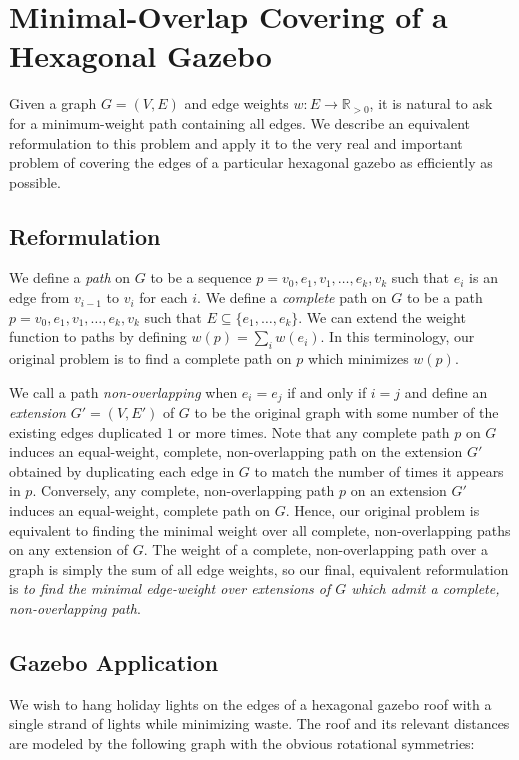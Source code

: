 \documentclass[11pt]{article}
\begin{document}
\section*{Minimal-Overlap Covering of a Hexagonal Gazebo}

Given a graph $G = (V, E)$ and edge weights $w: E \to \mathbb{R}_{> 0}$,
it is natural to ask for a minimum-weight path containing all edges.
We describe an equivalent reformulation to this problem
and apply it to the very real and important problem of covering the edges of a particular hexagonal gazebo as efficiently as possible.

\subsection*{Reformulation}

We define a \emph{path} on $G$ to be a sequence $p = v_0, e_1, v_1, \ldots, e_k, v_k$ such that
$e_i$ is an edge from $v_{i-1}$ to $v_{i}$ for each $i$.
We define a \emph{complete} path on $G$ to be a path $p = v_0, e_1, v_1, \ldots, e_k, v_k$ such that
$E \subseteq \{e_1, \ldots, e_k\}$.
We can extend the weight function to paths by defining $w(p) = \sum_{i} w(e_i)$.
In this terminology, our original problem is to find a complete path on $p$ which minimizes $w(p)$.

We call a path \emph{non-overlapping} when $e_i = e_j$ if and only if $i = j$
and define an \emph{extension} $G' = (V, E')$ of $G$ to be the original graph with some number of the existing edges duplicated $1$ or more times.
Note that any complete path $p$ on $G$
induces an equal-weight, complete, non-overlapping path on the extension $G'$
obtained by duplicating each edge in $G$ to match the number of times it appears in $p$.
Conversely, any complete, non-overlapping path $p$ on an extension $G'$
induces an equal-weight, complete path on $G$.
Hence, our original problem is equivalent to finding the minimal weight
over all complete, non-overlapping paths on any extension of $G$.
The weight of a complete, non-overlapping path over a graph is simply the sum of all edge weights,
so our final, equivalent reformulation is \emph{to find the minimal edge-weight over extensions of $G$ which admit a complete, non-overlapping path}.

\subsection*{Gazebo Application}

We wish to hang holiday lights on the edges of a hexagonal gazebo roof with a single strand of lights while minimizing waste.
The roof and its relevant distances are modeled by the following graph with the obvious rotational symmetries:
\end{document}
